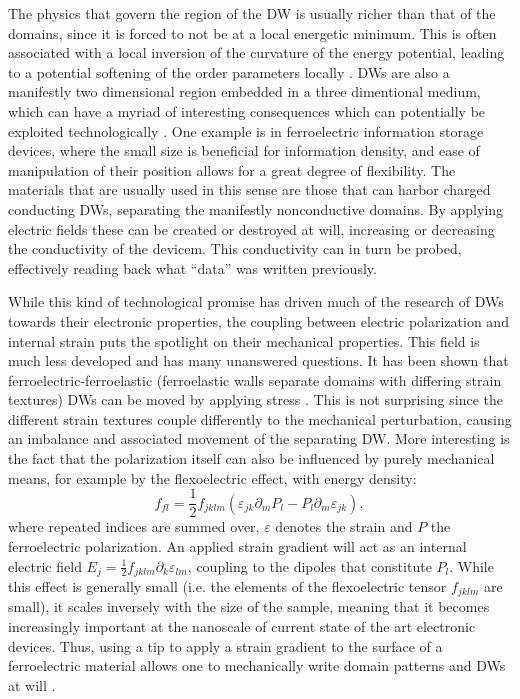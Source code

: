 The physics that govern the region of the DW is usually richer than that of the domains, since it is forced to not be at a local energetic minimum.
This is often associated with a local inversion of the curvature of the energy potential, leading to a potential softening of the order parameters locally \cite{Scott2012}.
DWs are also a manifestly two dimensional region embedded in a three dimentional medium, which can have a myriad of interesting consequences which can potentially be exploited technologically \cite{Salje2016}.
One example is in ferroelectric information storage devices, where the small size is beneficial for information density, and ease of manipulation of their position allows for a great degree of flexibility.
The materials that are usually used in this sense are those that can harbor charged conducting DWs, separating the manifestly nonconductive domains.
By applying electric fields these can be created or destroyed at will, increasing or decreasing the conductivity of the devicem.
This conductivity can in turn be probed, effectively reading back what ``data'' was written previously.

While this kind of technological promise has driven much of the research of DWs towards their electronic properties, the coupling between electric polarization and internal strain puts the spotlight on their mechanical properties.
This field is much less developed and has many unanswered questions. 
It has been shown that ferroelectric-ferroelastic (ferroelastic walls separate domains with differing strain textures) DWs can be moved by applying stress \cite{Schneider2001}. This is not surprising since the different strain textures couple differently to the mechanical perturbation, causing an imbalance and associated movement of the separating DW.
More interesting is the fact that the polarization itself can also be influenced by purely mechanical means, for example by the flexoelectric effect, with energy density:
\begin{equation}
f_{fl} = \frac{1}{2}f_{jklm}(\varepsilon_{jk}\partial_mP_l-P_l\partial_m\varepsilon_{jk}),
\end{equation}
where repeated indices are summed over, $\varepsilon$ denotes the strain and $P$ the ferroelectric polarization.
An applied strain gradient will act as an internal electric field $E_{j} = \frac{1}{2}f_{jklm}\partial_k\varepsilon_{lm}$, coupling to the dipoles that constitute $P_l$.
While this effect is generally small (i.e. the elements of the flexoelectric tensor $f_{jklm}$ are small), it scales inversely with the size of the sample, meaning that it becomes increasingly important at the nanoscale of current state of the art electronic devices.
Thus, using a tip to apply a strain gradient to the surface of a ferroelectric material allows one to mechanically write domain patterns and DWs at will \cite{Lu2012}.

